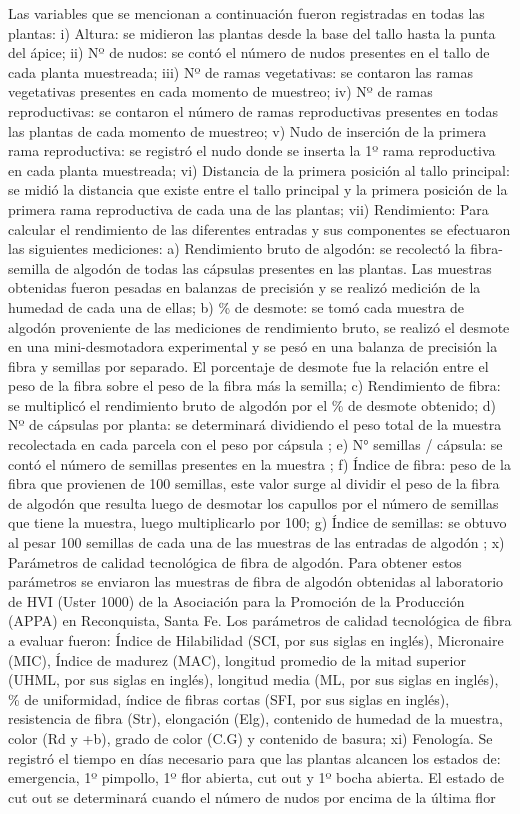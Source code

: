 \documentclass[12pt,oneside]{reedthesis}
\begin{document}
Las variables que se mencionan a continuación fueron registradas en todas las plantas: i) Altura: se midieron las plantas desde la base del tallo hasta la punta del ápice; ii) Nº de nudos: se contó el número de nudos presentes en el tallo de cada planta muestreada; iii) Nº de ramas vegetativas: se contaron las ramas vegetativas presentes en cada momento de muestreo; iv) Nº de ramas reproductivas: se contaron el número de ramas reproductivas presentes en todas las plantas de cada momento de muestreo; v) Nudo de inserción de la primera rama reproductiva: se registró el nudo donde se inserta la 1º rama reproductiva en cada planta muestreada; vi) Distancia de la primera posición al tallo principal: se midió la distancia que existe entre el tallo principal y la primera posición de la primera rama reproductiva de cada una de las plantas; vii) Rendimiento: Para calcular el rendimiento de las diferentes entradas y sus componentes se efectuaron las siguientes mediciones: a) Rendimiento bruto de algodón: se recolectó la fibra-semilla de algodón de todas las cápsulas presentes en las plantas. Las muestras obtenidas fueron pesadas en balanzas de precisión y se realizó medición de la humedad de cada una de ellas; b) \% de desmote: se tomó cada muestra de algodón proveniente de las mediciones de rendimiento bruto, se realizó el desmote en una mini-desmotadora experimental y se pesó en una balanza de precisión la fibra y semillas por separado. El porcentaje de desmote fue la relación entre el peso de la fibra sobre el peso de la fibra más la semilla; c) Rendimiento de fibra: se multiplicó el rendimiento bruto de algodón por el \% de desmote obtenido; d) Nº de cápsulas por planta: se determinará dividiendo el peso total de la muestra recolectada en cada parcela con el peso por cápsula \autocite{wells1984}; e) N° semillas / cápsula: se contó el número de semillas presentes en la muestra \autocite{worley1974}; f) Índice de fibra: peso de la fibra que provienen de 100 semillas, este valor surge al dividir el peso de la fibra de algodón que resulta luego de desmotar los capullos por el número de semillas que tiene la muestra, luego multiplicarlo por 100; g) Índice de semillas: se obtuvo al pesar 100 semillas de cada una de las muestras de las entradas de algodón \autocite{pettigrew2013}; x) Parámetros de calidad tecnológica de fibra de algodón. Para obtener estos parámetros se enviaron las muestras de fibra de algodón obtenidas al laboratorio de HVI (Uster 1000) de la Asociación para la Promoción de la Producción (APPA) en Reconquista, Santa Fe. Los parámetros de calidad tecnológica de fibra a evaluar fueron: Índice de Hilabilidad (SCI, por sus siglas en inglés), Micronaire (MIC), Índice de madurez (MAC), longitud promedio de la mitad superior (UHML, por sus siglas en inglés), longitud media (ML, por sus siglas en inglés), \% de uniformidad, índice de fibras cortas (SFI, por sus siglas en inglés), resistencia de fibra (Str), elongación (Elg), contenido de humedad de la muestra, color (Rd y +b), grado de color (C.G) y contenido de basura; xi) Fenología. Se registró el tiempo en días necesario para que las plantas alcancen los estados de: emergencia, 1º pimpollo, 1º flor abierta, cut out y 1º bocha abierta. El estado de cut out se determinará cuando el número de nudos por encima de la última flor 
\end{document}
